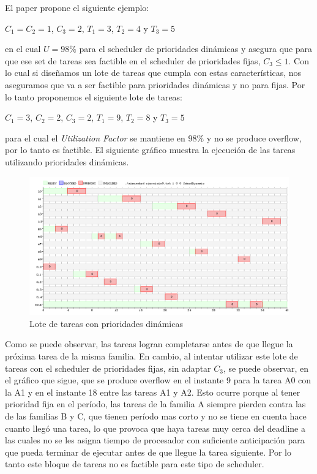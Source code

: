 \documentclass[a4paper,11pt]{article}
\begin{document}
El paper propone el siguiente ejemplo:
\begin{center}
$C_1 = C_2 = 1$, $C_3 = 2$, $T_1 = 3$, $T_2 = 4$ y $T_3 = 5$
\end{center}
en el cual $U = 98\% $ para el scheduler de prioridades dinámicas y asegura que para que ese set de tareas sea factible en el scheduler de prioridades fijas, $C_3 \leq 1$. Con lo cual si diseñamos un lote de tareas que cumpla con estas características, nos aseguramos que va a ser factible para prioridades dinámicas y no para fijas. Por lo tanto proponemos el siguiente lote de tareas:
\begin{center}
$C_1 = 3$, $ C_2 = 2$, $C_3 = 2$, $T_1 = 9$, $T_2 = 8$ y $T_3 = 5$
\end{center}
para el cual el \emph{Utilization Factor} se mantiene en $98\%$ y no se produce overflow, por lo tanto es factible. El siguiente gráfico muestra la ejecución de las tareas utilizando prioridades dinámicas.
\begin{figure}[H]
\centering
\includegraphics[scale=.6, width=1\textwidth]{graficos/ej9-dyn}
\caption{Lote de tareas con prioridades dinámicas}
\end{figure}
Como se puede observar, las tareas logran completarse antes de que llegue la próxima tarea de la misma familia. En cambio, al intentar utilizar este lote de tareas con el scheduler de prioridades fijas, sin adaptar $C_3$, se puede observar, en el gráfico que sigue, que se produce overflow en el instante 9 para la tarea A0 con la A1 y en el instante 18 entre las tareas A1 y A2. Esto ocurre porque al tener prioridad fija en el período, las tareas de la familia A siempre pierden contra las de las familias B y C, que tienen período mas corto y no se tiene en cuenta hace cuanto llegó una tarea, lo que provoca que haya tareas muy cerca del deadline a las cuales no se les asigna tiempo de procesador con suficiente anticipación para que pueda terminar de ejecutar antes de que llegue la tarea siguiente. Por lo tanto este bloque de tareas no es factible para este tipo de scheduler.  
\end{document}

